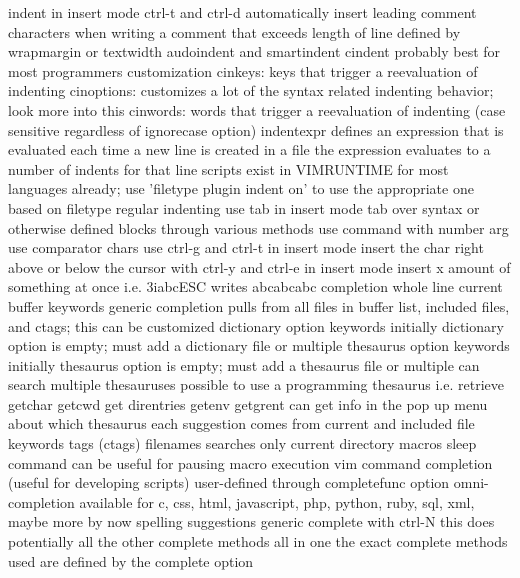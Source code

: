 \documentclass[12pt]{book}
\begin{document}
          indent in insert mode ctrl-t and ctrl-d
          automatically insert leading comment characters when writing a comment that exceeds length of line defined by wrapmargin or textwidth
          audoindent and smartindent
          cindent
            probably best for most programmers
            customization
              cinkeys: keys that trigger a reevaluation of indenting
              cinoptions: customizes a lot of the syntax related indenting behavior; look more into this
              cinwords: words that trigger a reevaluation of indenting (case sensitive regardless of ignorecase option)
          indentexpr
            defines an expression that is evaluated each time a new line is created in a file
            the expression evaluates to a number of indents for that line
            scripts exist in VIMRUNTIME for most languages already; use 'filetype plugin indent on' to use the appropriate one based on filetype
        regular indenting
          use tab in insert mode
          tab over syntax or otherwise defined blocks through various methods
          use command with number arg
          use comparator chars
          use ctrl-g and ctrl-t in insert mode
      insert the char right above or below the cursor with ctrl-y and ctrl-e in insert mode
      insert x amount of something at once i.e. 3iabcESC writes abcabcabc
    completion
      whole line
      current buffer keywords
      generic completion pulls from all files in buffer list, included files, and ctags; this can be customized
      dictionary option keywords
        initially dictionary option is empty; must add a dictionary file or multiple
      thesaurus option keywords
        initially thesaurus option is empty; must add a thesaurus file or multiple
        can search multiple thesauruses
        possible to use a programming thesaurus i.e. retrieve getchar getcwd get direntries getenv getgrent
        can get info in the pop up menu about which thesaurus each suggestion comes from
      current and included file keywords
      tags (ctags)
      filenames
        searches only current directory
      macros
        sleep command can be useful for pausing macro execution
      vim command completion (useful for developing scripts)
      user-defined through completefunc option
      omni-completion
        available for c, css, html, javascript, php, python, ruby, sql, xml, maybe more by now
      spelling suggestions
      generic complete with ctrl-N
        this does potentially all the other complete methods all in one
        the exact complete methods used are defined by the complete option
\end{document}
